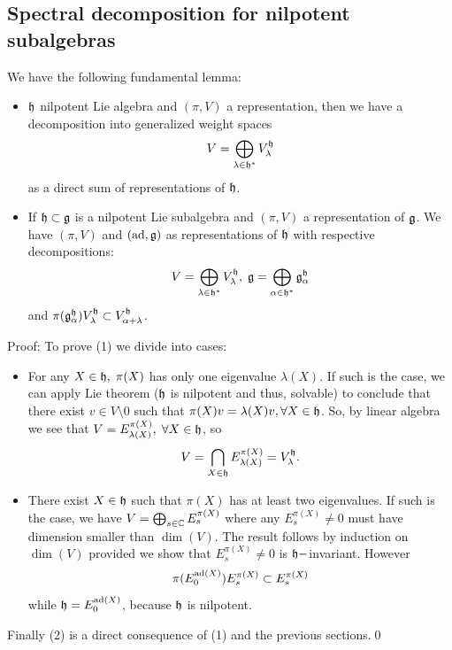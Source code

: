 \subsection{Spectral decomposition for nilpotent subalgebras}

\begin{dang}
    \begin{lemma}
        We have the following fundamental lemma:
        \begin{itemize}
            \item[(1)] $\mathfrak{h}$ nilpotent Lie algebra and $(\pi,V)$ a representation, then we have a decomposition into 
            generalized weight spaces
            \begin{equation}
                V = \bigoplus_{\lambda\in\mathfrak{h}^*}V_\lambda^{\mathfrak{h}}
            \end{equation}
            as a direct sum of representations of $\mathfrak{h}$.
            \item[(2)] If $\mathfrak{h}\subset\mathfrak{g}$ is a nilpotent Lie subalgebra and $(\pi, V)$ a representation of $\mathfrak{g}$. We have
            $(\pi,V)$ and $(\text{ad},\mathfrak{g})$ as representations of $\mathfrak{h}$ with respective decompositions:
            \begin{equation}
                V = \bigoplus_{\lambda\in\mathfrak{h}^*}V_\lambda^{\mathfrak{h}},\; \mathfrak{g}=\bigoplus_{\alpha\in\mathfrak{h}^*}\mathfrak{g}_\alpha^{\mathfrak{h}}
            \end{equation}
            and $\pi(\mathfrak{g}_\alpha^{\mathfrak{h}})V_\lambda^{\mathfrak{h}}\subset V_{\alpha+\lambda}^{\mathfrak{h}}$.
        \end{itemize}
    \end{lemma}
\end{dang}
Proof: To prove (1) we divide into cases:
\begin{itemize}
    \item[Case 1.] For any $X\in\mathfrak{h},\;\pi(X)$ has only one eigenvalue $\lambda(X)$. 
    If such is the case, we can apply Lie theorem 
    ($\mathfrak{h}$ is nilpotent and thus, solvable) to conclude that there exist $v\in V\setminus0$ such that 
    $\pi(X)v=\lambda(X)v,\forall X\in\mathfrak{h}$. So, by linear algebra we see that 
    $V=E_{\lambda(X)}^{\pi(X)},\;\forall X\in\mathfrak{h}$, so 
    \begin{equation}
        V = \bigcap_{X\in\mathfrak{h}}E_{\lambda(X)}^{\pi(X)}=V_\lambda^{\mathfrak{h}}.
    \end{equation}
    \item[Case 2.] There exist $X\in\mathfrak{h}$ such that $\pi(X)$ has at least two eigenvalues.
    If such is the case, we have $V=\bigoplus_{s\in\mathbb{C}} E_s^{\pi(X)}$ where any $E_s^{\pi(X)}\neq0$ must have dimension 
    smaller than $\dim(V)$. The result follows by induction on $\dim(V)$ provided we show that $E_s^{\pi(X)}\neq0$ is 
    $\mathfrak{h}-$invariant. However
    \begin{equation}
        \pi(E_0^{\text{ad}(X)})E_s^{\pi(X)}\subset E_s^{\pi(X)}
    \end{equation}
    while $\mathfrak{h}=E_0^{\text{ad}(X)}$, because $\mathfrak{h}$ is nilpotent.
\end{itemize}
Finally (2) is a direct consequence of (1) and the previous sections.\qed


